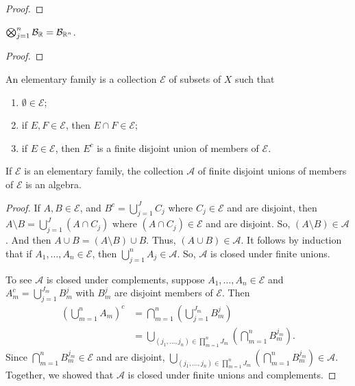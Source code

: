 \begin{proof}

\end{proof}



\begin{corollary}
    $\bigotimes_{j=1}^{n} \mathcal{B}_{\mathbb{R}} = \mathcal{B}_{\mathbb{R}^n}$.
\end{corollary}

\begin{proof}

\end{proof}

\begin{definition}
    An elementary family is a collection $\mathcal{E}$ of subsets of $X$ such that
    \begin{enumerate}
        \item $\emptyset \in \mathcal{E}$;
        \item if $E, F \in \mathcal{E}$, then $E \cap F \in \mathcal{E}$;
        \item if $E \in \mathcal{E}$, then $E^c$ is a finite disjoint union of members of $\mathcal{E}$.
    \end{enumerate}
\end{definition}

\begin{proposition}
    If $\mathcal{E}$ is an elementary family, the collection $\mathcal{A}$ of finite disjoint unions of members of $\mathcal{E}$ is an algebra.
\end{proposition}

\begin{proof}
    If $A, B \in \mathcal{E}$, and $B^c = \bigcup_{j=1}^{J} C_j$ where $C_j \in \mathcal{E}$ and are disjoint, then $A \setminus B = \bigcup_{j=1}^{J} (A \cap C_j)$ where $(A \cap C_j) \in \mathcal{E}$ and are disjoint.
    So, $(A \setminus B) \in \mathcal{A}$.
    And then $A \cup B = (A \setminus B) \cup B$.
    Thus, $(A \cup B) \in \mathcal{A}$.
    It follows by induction that if $A_1, \dots, A_n \in \mathcal{E}$, then $\bigcup_{j=1}^{n} A_j \in \mathcal{A}$.
    So, $\mathcal{A}$ is closed under finite unions.

    To see $\mathcal{A}$ is closed under complements, suppose $A_1, \dots, A_n \in \mathcal{E}$ and $A_m^c = \bigcup_{j=1}^{J_m} B_{m}^{j}$ with $B_{m}^{j}$ are disjoint members of $\mathcal{E}$.
    Then
    \begin{align}
        \left( \bigcup_{m=1}^{n} A_m \right)^c &= \bigcap_{m=1}^{n} \left( \bigcup_{j=1}^{J_m} B_{m}^{j} \right) \\
        &= \bigcup_{(j_1,\dots,j_n) \in \prod_{m=1}^{n} J_{m}} \left( \bigcap_{m=1}^{n} B_{m}^{j_m} \right).
    \end{align}
    Since $\bigcap_{m=1}^{n} B_{m}^{j_m} \in \mathcal{E}$ and are disjoint, $\bigcup_{(j_1,\dots,j_n) \in \prod_{m=1}^{n} J_{m}} \left( \bigcap_{m=1}^{n} B_{m}^{j_m} \right) \in \mathcal{A}$.
    Together, we showed that $\mathcal{A}$ is closed under finite unions and complements.
\end{proof}

